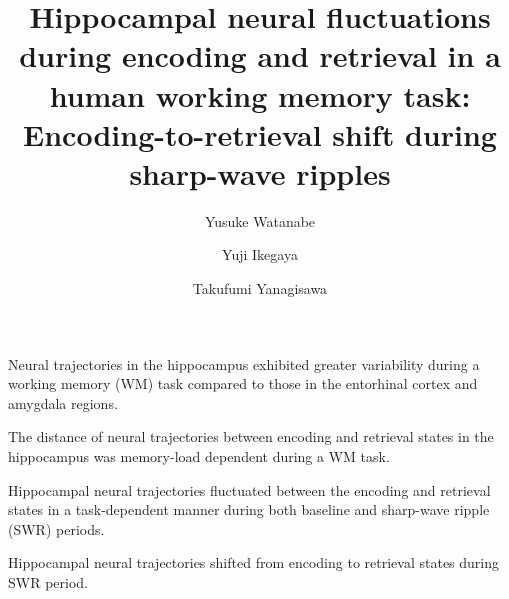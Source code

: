 \documentclass[final,3p,times,twocolumn]{elsarticle}
\begin{document}
\begin{frontmatter}
\begin{highlights}

\item Neural trajectories in the hippocampus exhibited greater variability during a working memory (WM) task compared to those in the entorhinal cortex and amygdala regions.

\item The distance of neural trajectories between encoding and retrieval states in the hippocampus was memory-load dependent during a WM task.


\item Hippocampal neural trajectories fluctuated between the encoding and retrieval states in a task-dependent manner during both baseline and sharp-wave ripple (SWR) periods.

\item Hippocampal neural trajectories shifted from encoding to retrieval states during SWR period.

\end{highlights}\title{
Hippocampal neural fluctuations during encoding and retrieval in a human working memory task: Encoding-to-retrieval shift during sharp-wave ripples
}

\author[1]{Yusuke Watanabe}
\author[2,3,4]{Yuji Ikegaya}
\author[1,5]{Takufumi Yanagisawa}

\address[1]{Institute for Advanced Cocreation studies, Osaka University, 2-2 Yamadaoka, Suita, 565-0871, Osaka, Japan}
\address[2]{Graduate School of Pharmaceutical Sciences, The University of Tokyo, 7-3-1 Hongo, Tokyo, 113-0033, Japan}
\address[3]{Institute for AI and Beyond, The University of Tokyo, 7-3-1 Hongo, Tokyo, 113-0033, Japan}
\address[4]{Center for Information and Neural Networks, National Institute of Information and Communications Technology, 1-4 Yamadaoka, Suita City, 565-0871, Osaka, Japan}
\address[5]{Department of Neurosurgery, Osaka University Graduate School of Medicine, 2-2 Yamadaoka, Osaka, 565-0871, Japan}

\begin{abstract}


\end{abstract}
\end{frontmatter}
\end{document}
